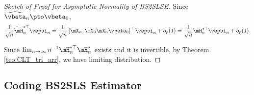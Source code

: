 \begin{proof}[Sketch of Proof for Asymptotic Normality of BS2SLSE]
Since $\widehat{\vbeta}_n \pto \vbeta_0$, 
\begin{equation*}
\frac{1}{\sqrt{n}}\widetilde{\mH}_n^{*\top}\vepsi_n = \frac{1}{\sqrt{n}}\left[\mX_n, \mG_0\mX_n\vbeta_0\right]^\top \vepsi_n + o_p(1) = \frac{1}{\sqrt{n}}\mH_n^{*\top}\vepsi_n + o_p(1).
\end{equation*}

Since $\lim_{n\to\infty}n^{-1}\mH_n^{*\top}\mH_n^{*}$ exists and it is invertible, by Theorem \ref{teo:CLT_tri_arr}, we have limiting distribution.
\end{proof}

\subsection{Coding BS2SLS Estimator}

